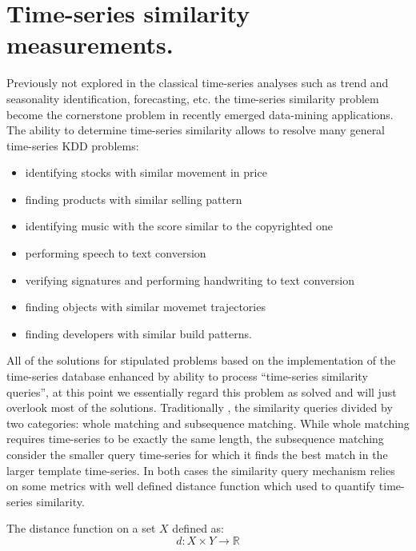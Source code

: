 \chapter{Time-series similarity measurements.}
Previously not explored in the classical time-series analyses such as trend and seasonality identification, forecasting, etc. the time-series similarity problem become the cornerstone problem in recently emerged data-mining applications. The ability to determine time-series similarity allows to resolve many general time-series KDD problems:
\begin{itemize}
	\item identifying stocks with similar movement in price \cite{citeulike:4295242} \cite{citeulike:4031865} \cite{citeulike:4025073}
	\item finding products with similar selling pattern \cite{citeulike:4326324}
	\item identifying music with the score similar to the copyrighted one \cite{citeulike:3821484} \cite{citeulike:3815076}
	\item performing speech to text conversion \cite{citeulike:3728228}
	\item verifying signatures and performing handwriting to text conversion \cite{citeulike:3733947} \cite{citeulike:3513035}
	\item finding objects with similar movemet trajectories \cite{citeulike:964832} \cite{citeulike:3728229} \cite{citeulike:3815864}
	\item finding developers with similar build patterns.
\end{itemize}

All of the solutions for stipulated problems based on the implementation of the time-series database enhanced by ability to process ``time-series similarity queries'', at this point we essentially regard this problem as solved and will just overlook most of the solutions.  Traditionally \cite{citeulike:3973409}, the similarity queries divided by two categories: whole matching and subsequence matching. While whole matching requires time-series to be exactly the same length, the subsequence matching consider the smaller query time-series for which it finds the best match in the larger template time-series. In both cases the similarity query mechanism relies on some metrics with well defined distance function which used to quantify time-series similarity. 

The distance function on a set $X$ defined as:
\begin{equation}
 d: X \times Y \rightarrow \mathbb{R}
\end{equation}

